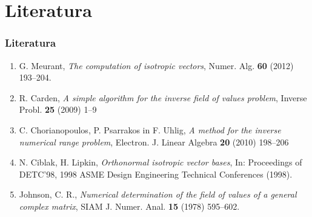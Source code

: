 \documentclass{beamer}
\begin{document}
\section{Literatura}
\begin{frame}
\frametitle{Literatura}
\begin{enumerate}
\item
G. Meurant, \emph{The computation of isotropic vectors}, Numer. Alg. {\bf 60} (2012) 193--204.
\item
R. Carden, \emph{A simple algorithm for the inverse field of values problem}, Inverse Probl. {\bf 25} (2009) 1--9
\item
C. Chorianopoulos, P. Psarrakos in F. Uhlig, \emph{A method for the inverse numerical range problem}, Electron. J. Linear Algebra {\bf 20} (2010) 198--206
\item
N. Ciblak, H. Lipkin, \emph{Orthonormal isotropic vector bases}, In: Proceedings of DETC'98, 1998 ASME Design Engineering Technical Conferences (1998).
\item
Johnson, C. R., \emph{Numerical determination of the field of values of a general complex matrix}, SIAM J. Numer. Anal. {\bf15} (1978) 595--602.
\end{enumerate}
\end{frame}
\end{document}
